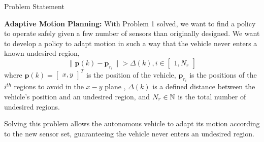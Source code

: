 \begin{section}{Problem Statement}
\begin{problem} \label{problem2} {\textbf{Adaptive Motion Planning:}}
With Problem 1 solved, we want to find a policy to operate safely given a few number of sensors than originally designed. We want to develop a policy to adapt motion in such a way that the vehicle never enters a known undesired region,
	\begin{equation}
		\lVert {\bm{p}(k)-\bm{p}_{r_i}} \rVert >\Delta(k),  i \in \begin{bmatrix} 1,N_r \end{bmatrix}
	\end{equation}
where $\bm{p}(k)={\begin{bmatrix} x,y \end{bmatrix}}^T$ is the position of the vehicle, $\bm{p}_{r_i}$ is the positions of the ${i}^{th}$ regions to avoid in the $x-y$ plane , $\Delta(k)$ is a defined distance between the vehicle's position and an undesired region, and $N_r \in \mathbb{N}$ is the total number of undesired regions. 
\end{problem}

Solving this problem allows the autonomous vehicle to adapt its motion according to the new sensor set, guaranteeing the vehicle never enters an undesired region.

\end{section}